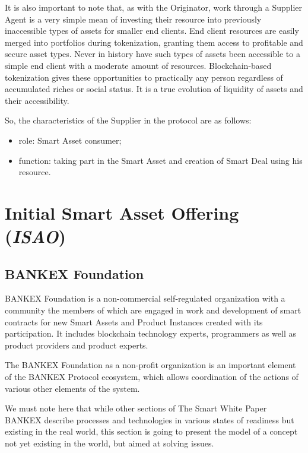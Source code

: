 \documentclass{article}
\begin{document}
\begin{multicols}{2}
It is also important to note that, as with the Originator, work through a Supplier Agent is a very simple mean of investing their resource into previously inaccessible types of assets for smaller end clients. End client resources are easily merged into portfolios during tokenization, granting them access to profitable and secure asset types. Never in history have such types of assets been accessible to a simple end client with a moderate amount of resources. Blockchain-based tokenization gives these opportunities to practically any person regardless of accumulated riches or social status. It is a true evolution of liquidity of assets and their accessibility.

So, the characteristics of the Supplier in the protocol are as follows:

\begin{itemize}
\item role: Smart Asset consumer;
\item function: taking part in the Smart Asset and creation of Smart Deal using his resource.
\end{itemize}

\section{Initial Smart Asset Offering (\textit{ISAO})}

\subsection{BANKEX Foundation}

BANKEX Foundation is a non-commercial self-regulated organization with a community the members of which are engaged in work and development of smart contracts for new Smart Assets and Product Instances created with its participation. It includes blockchain technology experts, programmers as well as product providers and product experts.

The BANKEX Foundation as a non-profit organization is an important element of the BANKEX Protocol ecosystem, which allows coordination of the actions of various other elements of the system.

We must note here that while other sections of The Smart White Paper BANKEX describe processes and technologies in various states of readiness but existing in the real world, this section is going to present the model of a concept not yet existing in the world, but aimed at solving issues.


\end{multicols}
\end{document}
